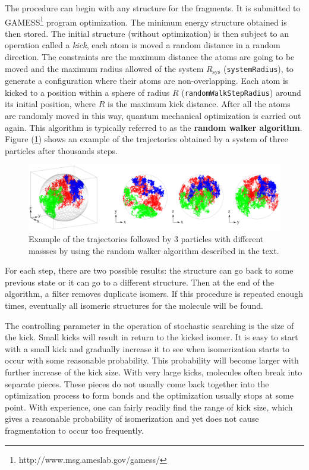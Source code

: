 \documentclass[a4paper,12pt]{article}
\begin{document}

The procedure can begin with any structure for the fragments. It is submitted to GAMESS\footnote{http://www.msg.ameslab.gov/gamess/} program optimization.
The minimum energy structure obtained is then stored. The initial structure (without optimization) is then subject to an operation called a \textit{kick},
each atom is moved a random distance in a random direction. The constraints are the maximum distance the atoms are going to be moved and the maximum radius allowed of the system $R_{\text{sys}}$ (\texttt{systemRadius}), to generate a configuration where their atoms are non-overlapping. Each atom is kicked to a position within a sphere of radius $R$ (\texttt{randomWalkStepRadius}) around
its initial position, where $R$ is the maximum kick distance. After all the atoms are randomly moved in this way, quantum mechanical optimization
is carried out again. This algorithm is typically referred to as the \textbf{random walker algorithm}. Figure (\ref{fig: random walkers}) shows an example of the trajectories obtained by a system of three particles after thousands steps.

\begin{figure}[h]
\centering
\includegraphics[scale=0.2]{images/randomWalkers.eps}
\caption{\footnotesize{
Example of the trajectories followed by 3 particles with different massses by using the random walker algorithm described in the text.
}}
\label{fig: random walkers}
\end{figure}

For each step, there are two possible results: the structure can go back to some previous state or it can go to a different structure. Then at the end
of the algorithm, a filter removes duplicate isomers. If this procedure is repeated enough times, eventually all isomeric structures for the molecule will be found.

The controlling parameter in the operation of stochastic searching is the size of the kick. Small kicks will result in return to the kicked isomer. It is easy to start with a small kick and gradually increase it to see when isomerization starts to occur with some reasonable probability. This probability will become larger with further increase of the kick size. With very large kicks, molecules often break into separate pieces. These pieces do not usually come back together into
the optimization process to form bonds and the optimization usually stops at some point. With experience, one can fairly readily find the range of kick size, which gives a reasonable probability of isomerization and yet does not cause fragmentation to occur too frequently.
\end{document}
